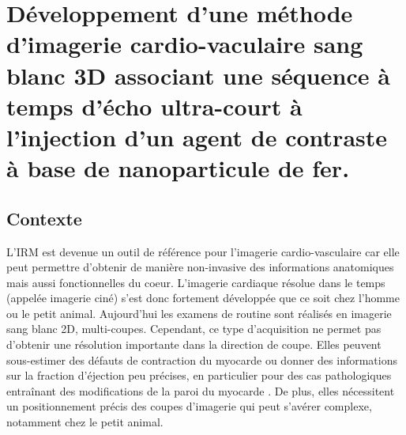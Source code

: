 
\chapter{Développement d'une méthode d'imagerie cardio-vaculaire sang blanc 3D associant une séquence à temps d'écho ultra-court à l'injection d'un agent de contraste à base de nanoparticule de fer.}
\setlength{\footskip}{50pt}
\label{Chap4}
\section{Contexte}


L’IRM est devenue un outil de référence pour l’imagerie cardio-vasculaire car elle peut permettre d’obtenir de manière non-invasive des informations anatomiques mais aussi fonctionnelles du coeur. L’imagerie cardiaque résolue dans le temps (appelée imagerie ciné)  s’est donc fortement développée que ce soit chez l’homme ou le petit animal. 
Aujourd'hui les examens de routine sont réalisés en imagerie sang blanc 2D, multi-coupes. Cependant, ce type d'acquisition ne permet pas d’obtenir une résolution importante dans la direction de coupe. Elles peuvent sous-estimer des défauts de contraction du myocarde ou donner des informations sur la fraction d’éjection peu précises, en particulier pour des cas pathologiques entraînant des modifications de la paroi du myocarde \cite{Friedrich:2000aa}. De plus, elles nécessitent un positionnement précis des coupes d'imagerie qui peut s'avérer complexe, notamment chez le petit animal.

